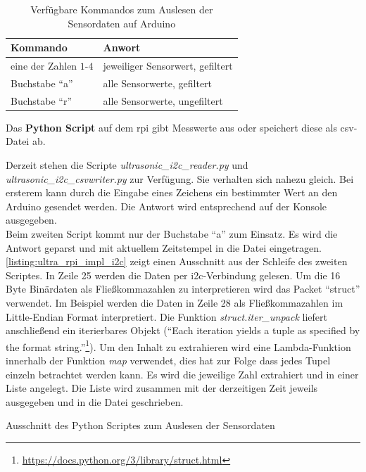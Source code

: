 \begin{table}[!ht]
    \centering
    \caption{Verfügbare Kommandos zum Auslesen der Sensordaten auf Arduino}
    \begin{tabularx}{0.7\textwidth}{ l | l }
    Kommando & Anwort \\ \hline
    eine der Zahlen $1$-$4$ & jeweiliger Sensorwert, gefiltert\\
    Buchstabe \enquote{a} & alle Sensorwerte, gefiltert\\
    Buchstabe \enquote{r} & alle Sensorwerte, ungefiltert
    \label{tab:ultra_arduino_impl_i2c}
    \end{tabularx}
\end{table}

Das \textbf{\large Python Script} auf dem \gls{rpi} gibt Messwerte aus oder speichert diese als \acrshort{csv}-Datei ab.

Derzeit stehen die Scripte \textit{ultrasonic\_i2c\_reader.py} und \textit{ultrasonic\_i2c\_csvwriter.py} zur Verfügung. Sie verhalten sich nahezu gleich. Bei ersterem kann durch die Eingabe eines Zeichens ein bestimmter Wert an den Arduino gesendet werden. Die Antwort wird entsprechend auf der Konsole ausgegeben.\\
Beim zweiten Script kommt nur der Buchstabe \enquote{a} zum Einsatz. Es wird die Antwort geparst und mit aktuellem Zeitstempel in die Datei eingetragen. \ref{listing:ultra_rpi_impl_i2c} zeigt einen Ausschnitt aus der Schleife des zweiten Scriptes. In Zeile 25 werden die Daten per \gls{i2c}-Verbindung gelesen. Um die 16 Byte Binärdaten als Fließkommazahlen zu interpretieren wird das Packet \enquote{struct} verwendet. Im Beispiel werden die Daten in Zeile 28 als Fließkommazahlen im Little-Endian Format interpretiert. Die Funktion \textit{struct.iter\_unpack} liefert anschließend ein iterierbares Objekt (\enquote{Each iteration yields a tuple as specified by the format string.}\footnote{\url{https://docs.python.org/3/library/struct.html}}). Um den Inhalt zu extrahieren wird eine Lambda-Funktion innerhalb der Funktion \textit{map} verwendet, dies hat zur Folge dass jedes Tupel einzeln betrachtet werden kann. Es wird die jeweilige Zahl extrahiert und in einer Liste angelegt. Die Liste wird zusammen mit der derzeitigen Zeit jeweils ausgegeben und in die Datei geschrieben.

\begin{listing}[!ht]
    \caption{Ausschnitt des Python Scriptes zum Auslesen der Sensordaten}
    \label{listing:ultra_rpi_impl_i2c}
\end{listing}

